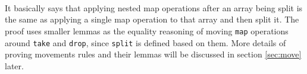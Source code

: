 \documentclass{l4proj}
\begin{document}
\begin{code}
\AgdaSymbol{(}\AgdaSpace{}%
\AgdaSpace{}%
\AgdaSymbol{)}\AgdaSpace{}%
\AgdaSpace{}%
\AgdaSpace{}%
\AgdaSpace{}%
\AgdaSymbol{(}\AgdaSpace{}%
\AgdaSpace{}%
\AgdaSymbol{(}\AgdaSpace{}%
\AgdaSpace{}%
\AgdaSymbol{))}\<%
\\
%
\>[2]\AgdaSpace{}%
\AgdaSpace{}%
\AgdaSymbol{(}\AgdaSpace{}%
\AgdaSpace{}%
\AgdaSymbol{(}\AgdaSpace{}%
\AgdaSpace{}%
\AgdaSymbol{)}\AgdaSpace{}%
\AgdaSymbol{)}\AgdaSpace{}%
\AgdaSymbol{(}\AgdaSpace{}%
\AgdaSymbol{(}\AgdaSpace{}%
\AgdaSymbol{)}\AgdaSpace{}%
\AgdaSymbol{(}\AgdaSpace{}%
\AgdaSpace{}%
\AgdaSpace{}%
\AgdaSymbol{))}\AgdaSpace{}%
\<%
\\
\>[2][@{}l@{\AgdaIndent{0}}]%
\>[4]\AgdaSpace{}%
\AgdaSpace{}%
\AgdaSymbol{(}\AgdaSpace{}%
\AgdaSpace{}%
\AgdaSymbol{)}\AgdaSpace{}%
\AgdaSpace{}%
\AgdaSpace{}%
\AgdaSpace{}%
\AgdaSymbol{(}\AgdaSpace{}%
\AgdaSpace{}%
\AgdaSymbol{(}\AgdaSpace{}%
\AgdaSpace{}%
\AgdaSymbol{))}\<%
\\
%
\>[2]\<%
\end{code}
It basically says that applying nested map operations after an array being split is the same as applying a single map operation to that array and then split it. The proof uses smaller lemmas as the equality reasoning of moving \texttt{map} operations around \texttt{take} and \texttt{drop}, since \texttt{split} is defined based on them. More details of proving movements rules and their lemmas will be discussed in section \ref{sec:move} later.
\end{document}
